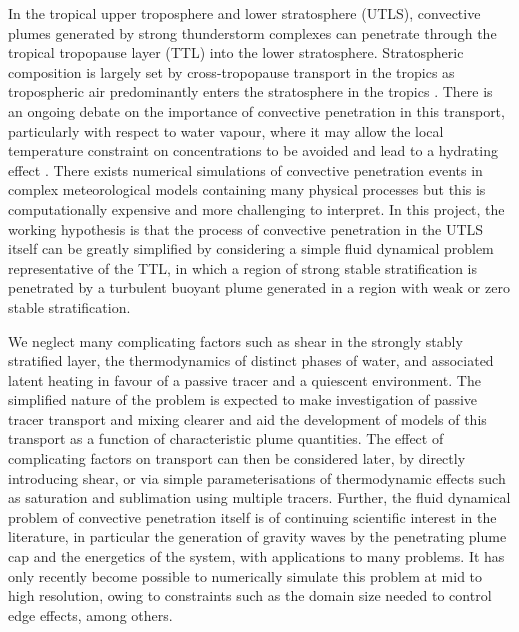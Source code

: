 \documentclass[a4paper]{article}
\begin{document}
In the tropical upper troposphere and lower stratosphere (UTLS), convective plumes generated by strong
thunderstorm complexes can penetrate through the tropical tropopause layer (TTL) into the lower stratosphere.
Stratospheric composition is largely set by cross-tropopause transport in the tropics as tropospheric air
predominantly enters the stratosphere in the tropics \citep{fueglistaler2009}. There is an ongoing debate on
the importance of convective penetration in this transport, particularly with respect to water vapour, where
it may allow the local temperature constraint on concentrations to be avoided and lead to a hydrating effect
\citep{jensen2007}. There exists numerical simulations of convective penetration events in complex
meteorological models \citep{dauhut2015, dauhut2018} containing many physical processes but this is
computationally expensive and more challenging to interpret. In this project, the working hypothesis is that
the process of convective penetration in the UTLS itself can be greatly simplified by considering a simple
fluid dynamical problem representative of the TTL, in which a region of strong stable stratification is
penetrated by a turbulent buoyant plume generated in a region with weak or zero stable stratification.

We neglect many complicating factors such as shear in the strongly stably stratified layer, the thermodynamics
of distinct phases of water, and associated latent heating in favour of a passive tracer and a quiescent
environment. The simplified nature of the problem is expected to make investigation of passive tracer
transport and mixing clearer and aid the development of models of this transport as a function of
characteristic plume quantities. The effect of complicating factors on transport can then be considered later,
by directly introducing shear, or via simple parameterisations of thermodynamic effects such as saturation and
sublimation using multiple tracers. Further, the fluid dynamical problem of convective penetration itself is of continuing scientific
interest in the literature, in particular the generation of gravity waves by the penetrating plume cap and the
energetics of the system, with applications to many problems. It has only recently become possible to
numerically simulate this problem at mid to high resolution, owing to constraints such as the domain size
needed to control edge effects, among others.
\end{document}
